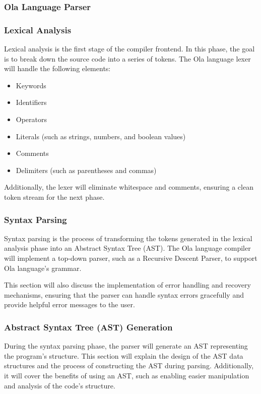 
\subsubsection{Ola Language Parser}
\subsubsection*{Lexical Analysis}
Lexical analysis is the first stage of the compiler frontend. In this phase, the goal is to break down the source code into a series of tokens. The Ola language lexer will handle the following elements:
\begin{itemize}
\item Keywords
\item Identifiers
\item Operators
\item Literals (such as strings, numbers, and boolean values)
\item Comments
\item Delimiters (such as parentheses and commas)
\end{itemize}

Additionally, the lexer will eliminate whitespace and comments, ensuring a clean token stream for the next phase.

\subsubsection*{Syntax Parsing}
Syntax parsing is the process of transforming the tokens generated in the lexical analysis phase into an Abstract Syntax Tree (AST). The Ola language compiler will implement a top-down parser, such as a Recursive Descent Parser, to support Ola language's grammar.

This section will also discuss the implementation of error handling and recovery mechanisms, ensuring that the parser can handle syntax errors gracefully and provide helpful error messages to the user.

\subsubsection*{Abstract Syntax Tree (AST) Generation}
During the syntax parsing phase, the parser will generate an AST representing the program's structure. This section will explain the design of the AST data structures and the process of constructing the AST during parsing. Additionally, it will cover the benefits of using an AST, such as enabling easier manipulation and analysis of the code's structure.

